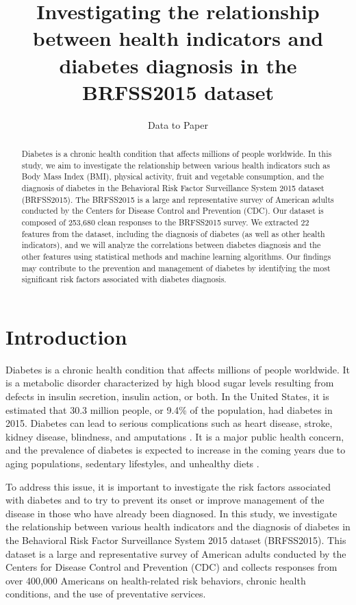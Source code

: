 \documentclass[12pt]{article}
\title{Investigating the relationship between health indicators and diabetes diagnosis in the BRFSS2015 dataset}
\author{Data to Paper}
\begin{document}
\maketitle

\begin{abstract}
Diabetes is a chronic health condition that affects millions of people worldwide. In this study, we aim to investigate the relationship between various health indicators such as Body Mass Index (BMI), physical activity, fruit and vegetable consumption, and the diagnosis of diabetes in the Behavioral Risk Factor Surveillance System 2015 dataset (BRFSS2015). The BRFSS2015 is a large and representative survey of American adults conducted by the Centers for Disease Control and Prevention (CDC). Our dataset is composed of 253,680 clean responses to the BRFSS2015 survey. We extracted 22 features from the dataset, including the diagnosis of diabetes (as well as other health indicators), and we will analyze the correlations between diabetes diagnosis and the other features using statistical methods and machine learning algorithms. Our findings may contribute to the prevention and management of diabetes by identifying the most significant risk factors associated with diabetes diagnosis.
\end{abstract}

\section{Introduction}

Diabetes is a chronic health condition that affects millions of people worldwide. It is a metabolic disorder characterized by high blood sugar levels resulting from defects in insulin secretion, insulin action, or both. In the United States, it is estimated that 30.3 million people, or 9.4\% of the population, had diabetes in 2015. Diabetes can lead to serious complications such as heart disease, stroke, kidney disease, blindness, and amputations \cite{Reichard1995Are}. It is a major public health concern, and the prevalence of diabetes is expected to increase in the coming years due to aging populations, sedentary lifestyles, and unhealthy diets \cite{Alkhalidy2021The}.

To address this issue, it is important to investigate the risk factors associated with diabetes and to try to prevent its onset or improve management of the disease in those who have already been diagnosed. In this study, we investigate the relationship between various health indicators and the diagnosis of diabetes in the Behavioral Risk Factor Surveillance System 2015 dataset (BRFSS2015). This dataset is a large and representative survey of American adults conducted by the Centers for Disease Control and Prevention (CDC) and collects responses from over 400,000 Americans on health-related risk behaviors, chronic health conditions, and the use of preventative services.
\end{document}
